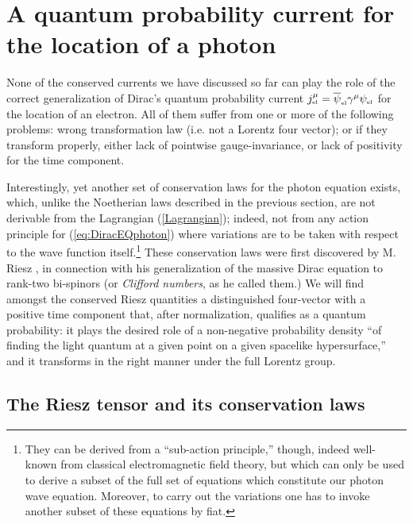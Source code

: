 \documentclass[11pt]{article}
\theoremstyle{definition}
\newcommand{\refeq}[1]{(\ref{#1})}
\numberwithin{equation}{section}
\newcommand{\psiEL}{{\psi_{\mbox{\rm\tiny el}}}}
\newcommand{\psiELb}{{\overline\psi_{\mbox{\rm\tiny el}}}}
\newcommand{\ga}{\gamma}
\begin{document}
\section{A quantum probability current for the location of a photon}\label{sec:riesz}

  None of the conserved currents we have discussed so far can play the role of 
the correct generalization of Dirac's quantum probability current $j_{\mbox{\tiny el}}^\mu = \psiELb\ga^\mu \psiEL$ for the 
location of an electron.
  All of them suffer from one or more of the following problems: wrong transformation law 
(i.e. not a Lorentz four vector); or if they transform properly, either lack of pointwise gauge-invariance, 
or lack of positivity for the time component. 

  Interestingly, yet another set of conservation laws for the photon equation exists, which, unlike the Noetherian laws described in the 
previous section, are not derivable from the Lagrangian \refeq{Lagrangian}; indeed, not from any action principle for \refeq{eq:DiracEQphoton}
where variations are to be taken with respect to the wave function itself.\footnote{They can be derived from a ``sub-action principle,'' though,
 indeed well-known from classical electromagnetic field theory, but which can only be used to derive a subset of the full set of equations which
 constitute our photon wave equation. 
 Moreover, to carry out the variations one has to invoke another subset of these equations by fiat.}
 These conservation laws were first discovered by M. Riesz \cite{Rie1946}, in connection with his generalization 
of the massive Dirac equation to rank-two bi-spinors (or {\em Clifford numbers}, as he called them.)
 We will find amongst the conserved Riesz quantities a distinguished four-vector with a positive time component
that, after normalization, qualifies as a quantum probability:
 it plays the desired role of a non-negative probability density ``of finding the light quantum at a given point on a 
given spacelike hypersurface,'' and it transforms in the right manner under the full Lorentz group.

\subsection{The Riesz tensor and its conservation laws}
\end{document}
